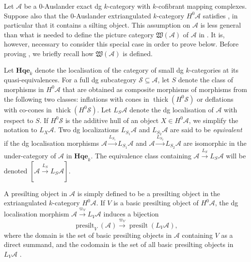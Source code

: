 \documentclass[10pt,twoside, a4paper,reqno]{amsart}
\DeclareMathOperator{\presilt}{presilt}
\DeclareMathOperator{\thick}{thick}
\newcommand{\tcmc}[1]{\mathfrak{W}(#1)}
\newcommand{\A}{\mathscr{A}}
\theoremstyle{definition}
\begin{document}
Let $\A$ be a 0-Auslander exact dg $k$-category with $k$-cofibrant mapping complexes. Suppose also that the 0-Auslander extriangulated $k$-category $H^0\A$ satisfies , in particular that it contains a silting object. This assumption on $\A$ is less general than what is needed to define the picture category $\tcmc{\A}$ of $\A$ {in \cite{Bor24}}. It is, however, necessary to consider this special case in order to prove  below. Before proving , we briefly recall how $\tcmc{\A}$ is defined.

Let $\mathbf{Hqe}_{k}$ denote the localisation of the category of small dg $k$-categories at its quasi-equivalences. For a full dg subcategory $\mathscr{S}\subseteq \A$, {let $S$ denote the class of morphisms in $H^0\A$ that are obtained as composite morphisms of morphisms from the following two classes: inflations with cones in $\thick(H^0\mathscr{S})$ or deflations with co-cones in $\thick(H^0\mathscr{S})$.}
Let ${L_{S}}\A$ denote the dg {localisation} of $\A$ with respect to $S$. If $H^0\mathscr{S}$ is the additive hull of an object $X\in H^0\A$, we simplify the notation to ${L_X\A}$. Two dg {localizations} ${L_{S_1}\A}$ and ${L_{S_2}\A}$ are said to be \textit{equivalent} if the dg localisation morphisms $\A \xrightarrow{L_{S_1}} {L_{S_1}\A}$ and $\A \xrightarrow{L_{S_2}} {L_{S_2}\A}$ are isomorphic in the under-category of $\A$ in $\mathbf{Hqe}_{k}$. The equivalence class containing $\A \xrightarrow{L_{S}} {L_{S}\A}$ will be denoted $[\A \xrightarrow{L_{S}} {L_{S}\A}]$.

A presilting object in $\A$ is simply defined to be a presilting object in the extriangulated $k$-category $H^0\A$. 
If $V$ is a basic presilting object of $H^0\A$, the dg localisation morphism $\A \xrightarrow{\varpi_{V}} {L_V\A}$ induces a bijection
\begin{equation}\label{eq:dgsiltred}
    \presilt_V(\A) \xrightarrow{\varpi_{V}} \presilt({L_V\A}),
\end{equation}
where the domain is the set of basic presilting objects in $\A$ containing $V$ as a direct summand, and the codomain is the set of all basic presilting objects in ${L_V\A}$ \cite[Cor. 5.16(iv)]{Bor24}. 
\end{document}
